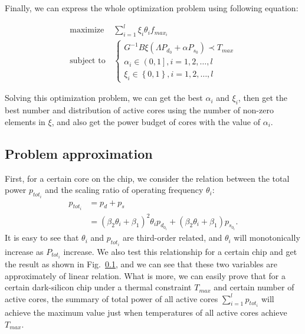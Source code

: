 Finally, we can express the whole optimization problem using following equation:

\begin{equation}
\begin{split}
\text{maximize} \,\, &\sum_{i=1}^l \xi_i \theta_i f_{max_i}\\
\text{subject to}
&\begin{cases}
G^{-1} B \xi \left( \Lambda P_{d_0}+ \alpha P_{s_0} \right) \prec T_{max} \\
\alpha_i \in \left(0,1\right], i=1,2,\ldots,l  \\
\xi_i \in \left\{0,1\right\}, i=1,2,\ldots,l
\end{cases}
\end{split}
\end{equation}



Solving this optimization problem, we can get the best $\alpha_i$ and $\xi_i$, then get the best number and distribution of active cores using the number of
non-zero elements in $\xi$, and also get the power budget of cores with the value of $\alpha_i$.
\subsection{Problem approximation}
First, for a certain core on the chip, we consider the relation between the total power $p_{tot_{i}}$ and the scaling ratio of operating frequency 
$\theta_i$:
\begin{equation}\label{p_tot and theta} 
\begin{split}
p_{tot_{i}} &=p_d + p_s\\
&= (\beta_{2} \theta_{i} + \beta_{1})^2 \theta_{i} p_{d_{0_i}} + (\beta_2 \theta_i + \beta_1) p_{s_{0_i}}.
\end{split}
\end{equation}  
It is easy to see that $\theta_i$ and $p_{tot_{i}}$ are third-order related, and $\theta_i$ will monotonically increase as 
$P_{tot_{i}}$ increase. We also test this relationship for a certain chip and get the result as shown in Fig.~\ref{}, and we 
can see that these two variables are approximately of linear relation. 
What is more, we can easily prove that for a certain dark-silicon chip under a thermal constraint $T_{max}$ and certain number of active cores, 
the summary of total power of all active cores $\sum_{i=1}^l p_{tot_{i}}$ will achieve the maximum value just when temperatures of all active cores achieve $T_{max}$.  

